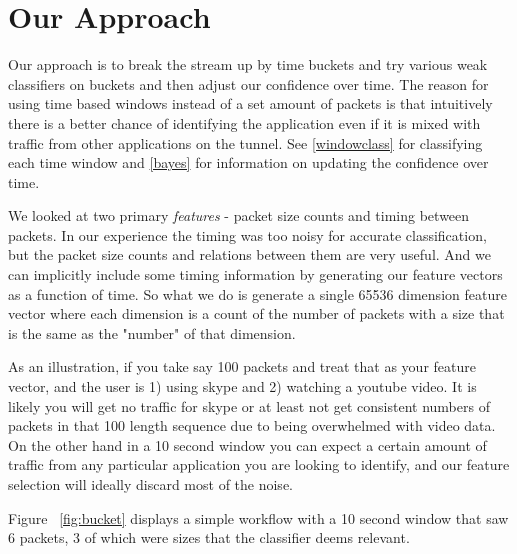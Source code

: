 \section{Our Approach}

Our approach is to break the stream up by time buckets and try various weak classifiers on buckets and then adjust our confidence over time.  The reason for using time based windows instead of a set amount of packets is that intuitively there is a better chance of identifying the application even if it is mixed with traffic from other applications on the tunnel. %
See \ref{windowclass} for classifying each time window and \ref{bayes} for information on updating the confidence over time.

We looked at two primary \emph{features} - packet size counts and timing between packets.  In our experience the timing was too noisy for accurate classification, but the packet size counts and relations between them are very useful.  And we can implicitly include some timing information by generating our feature vectors as a function of time.  So what we do is generate a single 65536 dimension feature vector where each dimension is a count of the number of packets with a size that is the same as the "number" of that dimension.


As an illustration, if you take say 100 packets and treat that as your feature vector, and the user is 1) using skype and 2) watching a youtube video.  It is likely you will get no traffic for skype or at least not get consistent numbers of packets in that 100 length sequence due to being overwhelmed with video data.  On the other hand  in a 10 second window you can expect a certain amount of traffic from any particular application you are looking to identify, and our feature selection will ideally discard most of the noise.

Figure ~\ref{fig:bucket} displays a simple workflow with a 10 second window that saw 6 packets, 3 of which were sizes that the classifier deems relevant.

